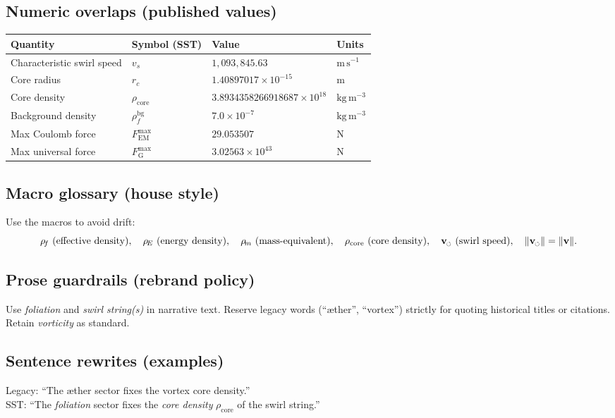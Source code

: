 \documentclass[11pt]{article}
\newcommand{\swirlarrow}{%
	\mathchoice{\mkern-2mu\scriptstyle\boldsymbol{\circlearrowleft}}%
	{\mkern-2mu\scriptstyle\boldsymbol{\circlearrowleft}}%
	{\mkern-2mu\scriptscriptstyle\boldsymbol{\circlearrowleft}}%
	{\mkern-2mu\scriptscriptstyle\boldsymbol{\circlearrowleft}}%
}
\newcommand{\vswirl}{\mathbf{v}_{\swirlarrow}}
\newcommand{\vscore}{v_s}                                %
\newcommand{\vnorm}{\lVert \vswirl \rVert}               %
\newcommand{\rhoF}{\rho_{\!f}}                           %
\newcommand{\rhoE}{\rho_{\!E}}                           %
\newcommand{\rhoM}{\rho_{\!m}}                           %
\newcommand{\rhoC}{\rho_{\mathrm{core}}} %
\newcommand{\FmaxEM}{F_{\mathrm{EM}}^{\max}}             %
\newcommand{\FmaxG}{F_{\mathrm{G}}^{\max}}               %
\begin{document}
	\subsection*{Numeric overlaps (published values)}
		\begin{center}
			\begin{tabular}{llll}
				\hline
				\textbf{Quantity} & \textbf{Symbol (SST)} & \textbf{Value} & \textbf{Units} \\
				\hline
				Characteristic swirl speed & $\vscore$ & $1{,}093{,}845.63$ & $\mathrm{m\,s^{-1}}$ \\
				Core radius & $r_c$ & $1.40897017\times 10^{-15}$ & $\mathrm{m}$ \\
				Core density & $\rhoC$ & $3.8934358266918687\times 10^{18}$ & $\mathrm{kg\,m^{-3}}$ \\
				Background density & $\rhoF^{\mathrm{bg}}$ & $7.0\times 10^{-7}$ & $\mathrm{kg\,m^{-3}}$ \\
				Max Coulomb force & $\FmaxEM$ & $29.053507$ & $\mathrm{N}$ \\
				Max universal force & $\FmaxG$ & $3.02563\times 10^{43}$ & $\mathrm{N}$ \\
				\hline
			\end{tabular}
		\end{center}

	\subsection*{Macro glossary (house style)}
		Use the macros to avoid drift:
		\[
			\rhoF\ (\text{effective density}),\quad
			\rhoE\ (\text{energy density}),\quad
			\rhoM\ (\text{mass-equivalent}),\quad
			\rhoC\ (\text{core density}),\quad
			\vswirl\ (\text{swirl speed}),\quad
			\vnorm=\lVert\mathbf{v}\rVert .
		\]

	\subsection*{Prose guardrails (rebrand policy)}
		Use \emph{foliation} and \emph{swirl string(s)} in narrative text. Reserve legacy words (``æther'', ``vortex'') strictly for quoting historical titles or citations. Retain \emph{vorticity} as standard.

	\subsection*{Sentence rewrites (examples)}
		Legacy: “The æther sector fixes the vortex core density.”\\
		SST: “The \emph{foliation} sector fixes the \emph{core density} $\rhoC$ of the swirl string.”
\end{document}
